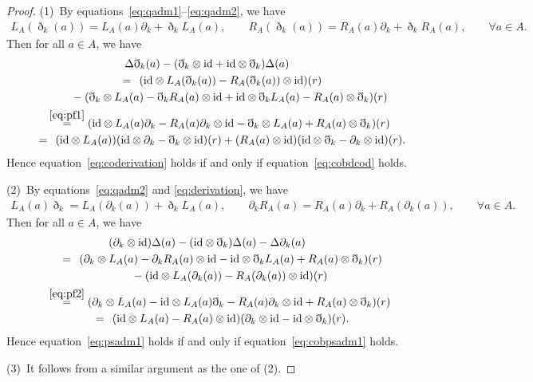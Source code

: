 \documentclass[10pt,a4paper]{amsart}
\numberwithin{equation}{section}
\newcommand{\id}{\mathrm{id}}
\begin{document}
\begin{proof}
 (1)~By equations~\eqref{eq:qadm1}--\eqref{eq:qadm2}, we have
 \begin{gather}
 L_A(\eth_k(a)) = L_A(a) \partial_k + \eth_k L_A(a), \qquad\!
 R_A(\eth_k(a)) = R_A(a) \partial_k + \eth_k R_A(a), \qquad\!
 \forall a \in A.\!\!\! \label{eq:pf1}
 \end{gather}
 Then for all $a \in A$, we have
 \begin{gather*}
 \Delta \eth_k(a) - (\eth_k \otimes \id + \id \otimes \eth_k ) \Delta(a) \\
 \qquad{}\overset{\hphantom{(4.7)}}{=} (\id \otimes L_A(\eth_k(a)) - R_A(\eth_k(a)) \otimes \id )(r) \\
 \qquad\qquad {}- (\eth_k \otimes L_A(a) - \eth_k R_A(a) \otimes \id + \id \otimes \eth_k L_A(a) - R_A(a) \otimes \eth_k )(r) \\
 \qquad{}\overset{\eqref{eq:pf1}}{=} (\id \otimes L_A(a) \partial_k - R_A(a) \partial_k \otimes \id - \eth_k \otimes L_A(a) + R_A(a) \otimes \eth_k )(r) \\
 \qquad{}\overset{\hphantom{(4.7)}}{=} ( \id \otimes L_A(a) )(\id \otimes \partial_k - \eth_k \otimes \id)(r) + (R_A(a)\otimes \id )(\id \otimes \eth_k - \partial_k \otimes \id)(r).
 \end{gather*}
 Hence equation~\eqref{eq:coderivation} holds if and only if equation~\eqref{eq:cobdcod} holds.

 (2)~By equations~\eqref{eq:qadm2} and \eqref{eq:derivation}, we have
 \begin{gather}
 L_A(a) \eth_k = L_A(\partial_k(a)) + \eth_k L_A(a), \qquad\!
 \partial_k R_A(a) = R_A(a) \partial_k + R_A(\partial_k(a)), \qquad\!
 \forall a \in A.\!\!\! \label{eq:pf2}
 \end{gather}
 Then for all $a \in A$, we have
 \begin{gather*}
 (\partial_k \otimes \id)\Delta(a) - (\id \otimes \eth_k )\Delta(a) - \Delta \partial_k(a) \\
 \qquad{}\overset{\hphantom{(4.8)}}{=} ( \partial_k \otimes L_A(a) - \partial_k R_A(a) \otimes \id - \id \otimes \eth_k L_A(a) + R_A(a) \otimes \eth_k )(r) \\
 \qquad\qquad {} - (\id \otimes L_A(\partial_k(a)) - R_A(\partial_k(a)) \otimes \id )(r) \\
 \qquad{} \overset{\eqref{eq:pf2}}{=} ( \partial_k \otimes L_A(a) - \id \otimes L_A(a) \eth_k - R_A(a) \partial_k \otimes \id + R_A(a) \otimes \eth_k )(r) \\
 \qquad{} \overset{\hphantom{(4.8)}}{=} (\id \otimes L_A(a) - R_A(a) \otimes \id )(\partial_k \otimes \id - \id \otimes \eth_k)(r).
 \end{gather*}
 Hence equation~\eqref{eq:psadm1} holds if and only if equation~\eqref{eq:cobpsadm1} holds.

 (3)~It follows from a similar argument as the one of (2).
\end{proof}
\end{document}
